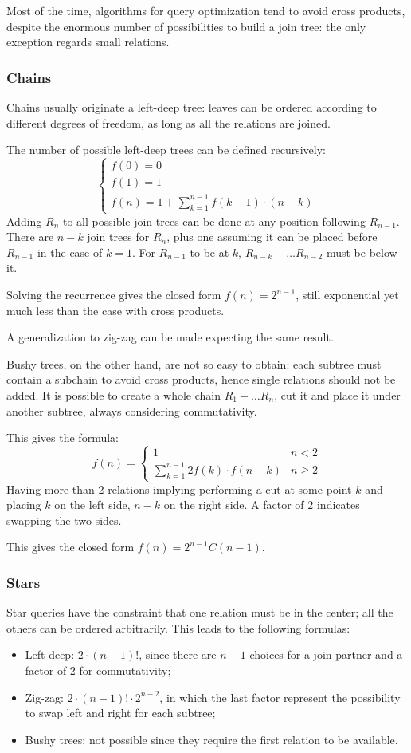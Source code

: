 Most of the time, algorithms for query optimization tend to avoid cross products, despite the enormous number of possibilities to build a join tree: the only exception regards small relations.

\subsubsection{Chains}
Chains usually originate a left-deep tree: leaves can be ordered according to different degrees of freedom, as long as all the relations are joined. 

The number of possible left-deep trees can be defined recursively:
$$\begin{cases}
f(0) = 0 \\
f(1) = 1 \\
f(n) = 1 + \sum_{k=1}^{n-1} f(k-1) \cdot (n - k)
\end{cases}$$
Adding $R_n$ to all possible join trees can be done at any position following $R_{n-1}$. There are $n - k$ join trees for $R_n$, plus one assuming it can be placed before $R_{n-1}$ in the case of $k=1$. For $R_{n-1}$ to be at $k$, $R_{n-k} - \dots R_{n-2}$ must be below it.

Solving the recurrence gives the closed form $f(n) = 2^{n-1}$, still exponential yet much less than the case with cross products.

A generalization to zig-zag can be made expecting the same result.

Bushy trees, on the other hand, are not so easy to obtain: each subtree must contain a subchain to avoid cross products, hence single relations should not be added. It is possible to create a whole chain $R_1 - \dots R_n$, cut it and place it under another subtree, always considering commutativity.

This gives the formula:
$$ f(n) = \begin{cases}
1 & n < 2 \\
\sum_{k=1}^{n-1} 2f(k) \cdot f(n-k) & n \geq 2
\end{cases}$$
Having more than 2 relations implying performing a cut at some point $k$ and placing $k$ on the left side, $n - k$ on the right side. A factor of 2 indicates swapping the two sides. 

This gives the closed form $f(n) = 2^{n-1}C(n-1)$.

\subsubsection{Stars}
Star queries have the constraint that one relation must be in the center; all the others can be ordered arbitrarily. This leads to the following formulas:
\begin{itemize}
	\item Left-deep: $2 \cdot (n - 1)!$, since there are $n - 1$ choices for a join partner and a factor of 2 for commutativity;
	\item Zig-zag: $2 \cdot (n - 1)! \cdot 2^{n-2}$, in which the last factor represent the possibility to swap left and right for each subtree;
	\item Bushy trees: not possible since they require the first relation to be available. 
\end{itemize}

